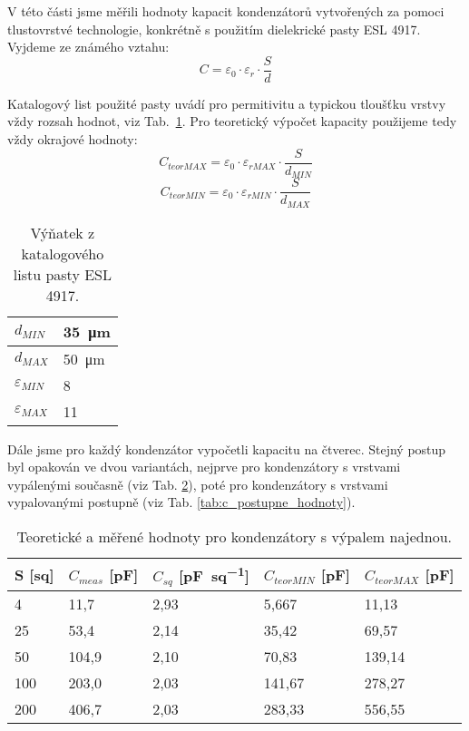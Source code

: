 V této části jsme měřili hodnoty kapacit kondenzátorů vytvořených za pomoci tlustovrstvé technologie, konkrétně s použitím dielekrické pasty ESL 4917. 
Vyjdeme ze známého vztahu:
\[
    C=\varepsilon_{0}\cdot\varepsilon_{r}\cdot\frac{S}{d}
\] 




Katalogový list použité pasty \cite{pastaDatasheet} uvádí pro permitivitu a typickou tloušťku vrstvy vždy rozsah hodnot, viz Tab.~\ref{tab:pasta_hodnoty_katalog}. Pro teoretický výpočet kapacity použijeme tedy vždy okrajové hodnoty:
\[
    C_{teor MAX} = \varepsilon_{0}\cdot\varepsilon_{r MAX}\cdot\frac{S}{d_{MIN} }
\]
\[
    C_{teor MIN} = \varepsilon_{0}\cdot\varepsilon_{r MIN}\cdot\frac{S}{d_{MAX} }
\]

\begin{table}[h!]
    \caption{Výňatek z katalogového listu pasty ESL 4917.}
    \centering
    \def\arraystretch{1.4}
    \begin{tabular}{l|l}
        \(d_{MIN} \)            & \qty{35}{\micro\meter} \\ \hline
        \(d_{MAX} \)            & \qty{50}{\micro\meter} \\ \hline
        \(\varepsilon_{MIN} \)  & 8                      \\ \hline
        \(\varepsilon_{MAX} \)  & 11                     \\ 
        \end{tabular}
    \label{tab:pasta_hodnoty_katalog}
\end{table}

Dále jsme pro každý kondenzátor vypočetli kapacitu na čtverec. Stejný postup byl opakován ve dvou variantách, nejprve pro kondenzátory s vrstvami vypálenými současně (viz Tab. \ref{tab:c_najednou_hodnoty}), poté pro kondenzátory s vrstvami vypalovanými postupně (viz Tab. \ref{tab:c_postupne_hodnoty}). 

\begin{table}[h!]
    \caption{Teoretické a měřené hodnoty pro kondenzátory s výpalem najednou.}
    \centering
    \def\arraystretch{1.4}
    \begin{tabular}{l|l|l||l|l}
        S [sq] & \(C_{meas} \) [\unit{\pico\farad}] & \(C_{sq} \) [\unit{\pico\farad\per sq}]  & \(C_{teor MIN}\) [\unit{\pico\farad}] & \(C_{teor MAX}\) [\unit{\pico\farad}]\\ \hline
        4      & 11,7   & 2,93  & 5,667     & 11,13    \\ \hline
        25     & 53,4   & 2,14  & 35,42     & 69,57    \\ \hline
        50     & 104,9  & 2,10  & 70,83     & 139,14   \\ \hline
        100    & 203,0  & 2,03  & 141,67    & 278,27   \\ \hline
        200    & 406,7  & 2,03  & 283,33    & 556,55   \\ 

        \end{tabular}
    \label{tab:c_najednou_hodnoty}
\end{table}

